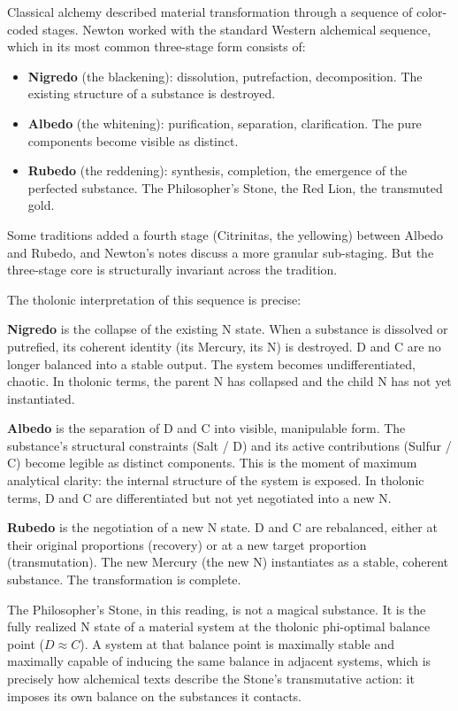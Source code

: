 \documentclass[12pt]{article}
\providecommand{\tightlist}{%
  \setlength{\itemsep}{0pt}\setlength{\parskip}{0pt}}
\begin{document}
Classical alchemy described material transformation through a sequence
of color-coded stages. Newton worked with the standard Western
alchemical sequence, which in its most common three-stage form consists
of:

\begin{itemize}
\tightlist
\item
  \textbf{Nigredo} (the blackening): dissolution, putrefaction,
  decomposition. The existing structure of a substance is destroyed.
\item
  \textbf{Albedo} (the whitening): purification, separation,
  clarification. The pure components become visible as distinct.
\item
  \textbf{Rubedo} (the reddening): synthesis, completion, the emergence
  of the perfected substance. The Philosopher's Stone, the Red Lion, the
  transmuted gold.
\end{itemize}

Some traditions added a fourth stage (Citrinitas, the yellowing) between
Albedo and Rubedo, and Newton's notes discuss a more granular
sub-staging. But the three-stage core is structurally invariant across
the tradition.

The tholonic interpretation of this sequence is precise:

\textbf{Nigredo} is the collapse of the existing N state. When a
substance is dissolved or putrefied, its coherent identity (its Mercury,
its N) is destroyed. D and C are no longer balanced into a stable
output. The system becomes undifferentiated, chaotic. In tholonic terms,
the parent N has collapsed and the child N has not yet instantiated.

\textbf{Albedo} is the separation of D and C into visible, manipulable
form. The substance's structural constraints (Salt / D) and its active
contributions (Sulfur / C) become legible as distinct components. This
is the moment of maximum analytical clarity: the internal structure of
the system is exposed. In tholonic terms, D and C are differentiated but
not yet negotiated into a new N.

\textbf{Rubedo} is the negotiation of a new N state. D and C are
rebalanced, either at their original proportions (recovery) or at a new
target proportion (transmutation). The new Mercury (the new N)
instantiates as a stable, coherent substance. The transformation is
complete.

The Philosopher's Stone, in this reading, is not a magical substance. It
is the fully realized N state of a material system at the tholonic
phi-optimal balance point (\(D \approx C\)). A system at that balance
point is maximally stable and maximally capable of inducing the same
balance in adjacent systems, which is precisely how alchemical texts
describe the Stone's transmutative action: it imposes its own balance on
the substances it contacts.
\end{document}
